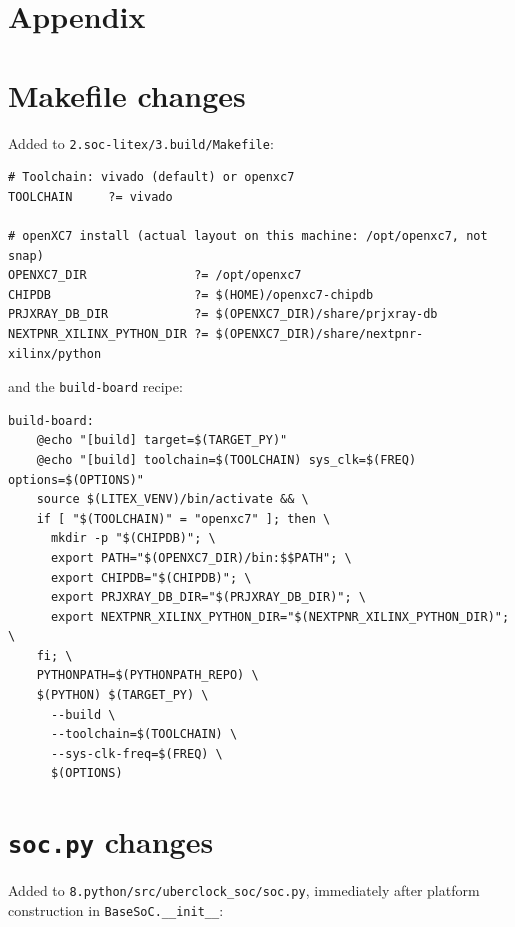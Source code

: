 \documentclass[11pt]{article}
\begin{document}
\section*{Appendix}
\appendix

\section{Makefile changes}
\label{app:makefile}

Added to \lstinline{2.soc-litex/3.build/Makefile}:

\begin{lstlisting}[style=codeblk]
# Toolchain: vivado (default) or openxc7
TOOLCHAIN     ?= vivado

# openXC7 install (actual layout on this machine: /opt/openxc7, not snap)
OPENXC7_DIR               ?= /opt/openxc7
CHIPDB                    ?= $(HOME)/openxc7-chipdb
PRJXRAY_DB_DIR            ?= $(OPENXC7_DIR)/share/prjxray-db
NEXTPNR_XILINX_PYTHON_DIR ?= $(OPENXC7_DIR)/share/nextpnr-xilinx/python
\end{lstlisting}

and the \lstinline{build-board} recipe:
\begin{lstlisting}[style=codeblk]
build-board:
	@echo "[build] target=$(TARGET_PY)"
	@echo "[build] toolchain=$(TOOLCHAIN) sys_clk=$(FREQ) options=$(OPTIONS)"
	source $(LITEX_VENV)/bin/activate && \
	if [ "$(TOOLCHAIN)" = "openxc7" ]; then \
	  mkdir -p "$(CHIPDB)"; \
	  export PATH="$(OPENXC7_DIR)/bin:$$PATH"; \
	  export CHIPDB="$(CHIPDB)"; \
	  export PRJXRAY_DB_DIR="$(PRJXRAY_DB_DIR)"; \
	  export NEXTPNR_XILINX_PYTHON_DIR="$(NEXTPNR_XILINX_PYTHON_DIR)"; \
	fi; \
	PYTHONPATH=$(PYTHONPATH_REPO) \
	$(PYTHON) $(TARGET_PY) \
	  --build \
	  --toolchain=$(TOOLCHAIN) \
	  --sys-clk-freq=$(FREQ) \
	  $(OPTIONS)
\end{lstlisting}

\section{\texttt{soc.py} changes}
\label{app:socpy}

Added to \lstinline{8.python/src/uberclock_soc/soc.py}, immediately after
platform construction in \lstinline{BaseSoC.__init__}:
\end{document}

